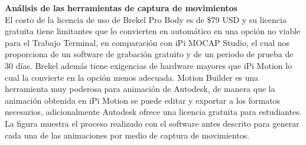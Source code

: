 \textbf{Análisis de las herramientas de captura de movimientos}\\

El costo de la licencia de uso de Brekel Pro Body es de \$79 USD y su licencia gratuita tiene limitantes que lo convierten en automático en una opción no viable para el Trabajo Terminal, en comparación con iPi MOCAP Studio, el cual nos proporciona de un software de grabación gratuito y de un periodo de prueba de 30 días. Brekel además tiene exigencias de hardware mayores que iPi Motion lo cual la convierte en la opción menos adecuada. Motion Builder es una herramienta muy poderosa para animación de Autodesk, de manera que la animación obtenida en iPi Motion se puede editar y exportar a los formatos necesarios, adicionalmente Autodesk ofrece una licencia gratuita para estudiantes.\\

La figura muestra el proceso realizado con el software antes descrito para generar cada una de las animaciones por medio de captura de movimientos.
\clearpage

